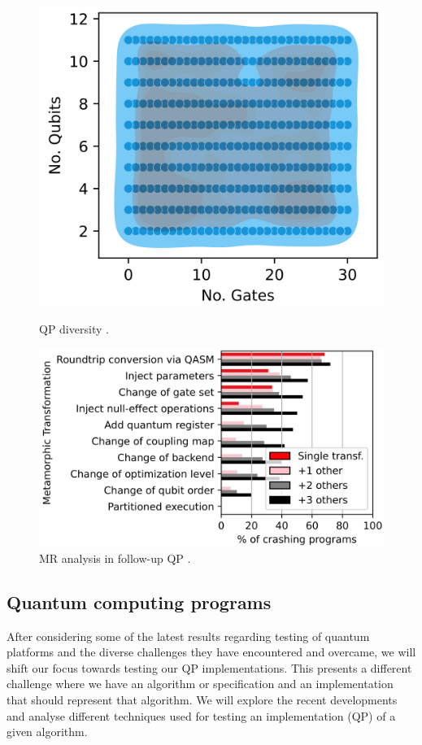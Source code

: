 \begin{itemize}
\begin{figure}[!tbp]
  \centering
  \begin{minipage}[b]{0.36\textwidth}
    \includegraphics[width=\textwidth]{TFM/photos/MorpgQDiverQP.png}
    \caption{QP diversity \cite{paltenghi2023morphq}.} 
    \label{Fig:MorpgQDiverQP}
  \end{minipage}
  \hfill
  \begin{minipage}[b]{0.55\textwidth}
    \includegraphics[width=\textwidth]{TFM/photos/MorphQMRCrash.png}
    \caption{MR analysis in follow-up QP \cite{paltenghi2023morphq}.} 
    \label{Fig:MorphQMRCrash}
  \end{minipage}
\end{figure}

\subsection{Quantum computing programs}
\label{Ch2.3.2:TQP}
After considering some of the latest results regarding testing of quantum platforms and the diverse challenges they have encountered and overcame, we will shift our focus towards testing our QP implementations. This presents a different challenge where we have an algorithm or specification and an implementation that should represent that algorithm. We will explore the recent developments and analyse different techniques used for testing an implementation (QP) of a given algorithm.


\end{itemize}
